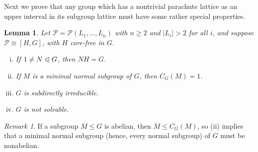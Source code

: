\documentclass[cm,dissertation]{uhthesis}
\theoremstyle{plain}
\newtheorem{lemma}[theorem]{Lemma}
\theoremstyle{definition}
\theoremstyle{remark}
\newtheorem*{remark}{Remark}
\numberwithin{theorem}{section}
\numberwithin{claim}{chapter}
\numberwithin{equation}{section}
\numberwithin{conjecture}{chapter}
\newcommand{\<}{\ensuremath{\langle}}
\renewcommand{\>}{\ensuremath{\rangle}}
\renewcommand{\leq}{\ensuremath{\leqslant}}
\renewcommand{\geq}{\ensuremath{\geqslant}}
\newcommand{\subnormal}{\ensuremath{\trianglelefteqslant}}
\newcommand{\0}{\ensuremath{\mathbf{0}}}
\newcommand{\1}{\ensuremath{\mathbf{1}}}
\newcommand{\2}{\ensuremath{\mathbf{2}}}
\newcommand{\3}{\ensuremath{\mathbf{3}}}
\newcommand{\4}{\ensuremath{\mathbf{4}}}
\newcommand{\5}{\ensuremath{\mathbf{5}}}
\newcommand{\sP}{\ensuremath{\mathscr{P}}}
\begin{document}
Next we prove that %
any group which has a nontrivial parachute lattice as an upper interval
in its subgroup lattice must have some rather special properties.  
\begin{lemma}
\label{lemma-wjd-5}
 Let $\sP = \sP(L_1, \dots, L_n)$ with $n\geq 2$ and $|L_i|>2$ for all
$i$, and suppose $\sP \cong [H, G]$, with $H$ core-free in $G$.  
\begin{enumerate}[(i)]
\item If $1\neq N \subnormal G$, then $NH = G$.
\item If $M$ is a minimal normal subgroup of $G$, then $C_G(M)=1$.
\item $G$ is subdirectly irreducible.
\item $G$ is not solvable.
\end{enumerate}
\end{lemma}
\begin{remark}
If a subgroup $M\leq G$ is abelian, then $M \leq C_G(M)$, so (ii) implies
that a minimal normal subgroup (hence, every normal subgroup) of $G$ must be
nonabelian.  
\end{remark}
\end{document}
